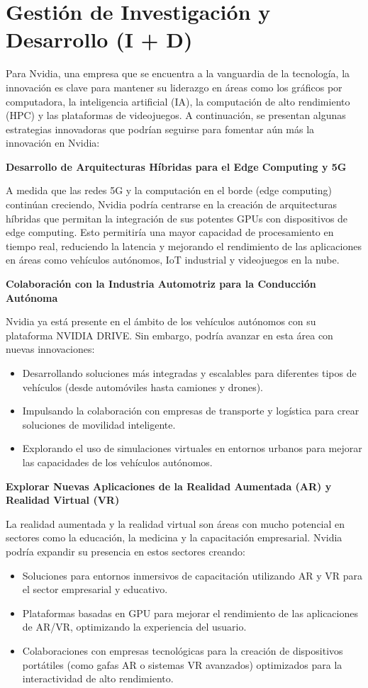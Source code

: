 \documentclass{article}
\begin{document}
\section{Gestión de Investigación y Desarrollo (I + D)}

Para Nvidia, una empresa que se encuentra a la vanguardia de la tecnología, la innovación es clave para mantener su liderazgo en áreas como los gráficos por computadora, la inteligencia artificial (IA), la computación de alto rendimiento (HPC) y las plataformas de videojuegos. A continuación, se presentan algunas estrategias innovadoras que podrían seguirse para fomentar aún más la innovación en Nvidia: 

\textbf{Desarrollo de Arquitecturas Híbridas para el Edge Computing y 5G}

A medida que las redes 5G y la computación en el borde (edge computing) continúan creciendo, Nvidia podría centrarse en la creación de arquitecturas híbridas que permitan la integración de sus potentes GPUs con dispositivos de edge computing. Esto permitiría una mayor capacidad de procesamiento en tiempo real, reduciendo la latencia y mejorando el rendimiento de las aplicaciones en áreas como vehículos autónomos, IoT industrial y videojuegos en la nube.

\textbf{Colaboración con la Industria Automotriz para la Conducción Autónoma}

Nvidia ya está presente en el ámbito de los vehículos autónomos con su plataforma NVIDIA DRIVE. Sin embargo, podría avanzar en esta área con nuevas innovaciones:
\begin{itemize}
  \item Desarrollando soluciones más integradas y escalables para diferentes tipos de vehículos (desde automóviles hasta camiones y drones).
  \item Impulsando la colaboración con empresas de transporte y logística para crear soluciones de movilidad inteligente.
  \item Explorando el uso de simulaciones virtuales en entornos urbanos para mejorar las capacidades de los vehículos autónomos.
\end{itemize}

\textbf{Explorar Nuevas Aplicaciones de la Realidad Aumentada (AR) y Realidad Virtual (VR)}

La realidad aumentada y la realidad virtual son áreas con mucho potencial en sectores como la educación, la medicina y la capacitación empresarial. Nvidia podría expandir su presencia en estos sectores creando:
\begin{itemize}
  \item Soluciones para entornos inmersivos de capacitación utilizando AR y VR para el sector empresarial y educativo.
  \item Plataformas basadas en GPU para mejorar el rendimiento de las aplicaciones de AR/VR, optimizando la experiencia del usuario.
  \item Colaboraciones con empresas tecnológicas para la creación de dispositivos portátiles (como gafas AR o sistemas VR avanzados) optimizados para la interactividad de alto rendimiento.
\end{itemize}
\end{document}
